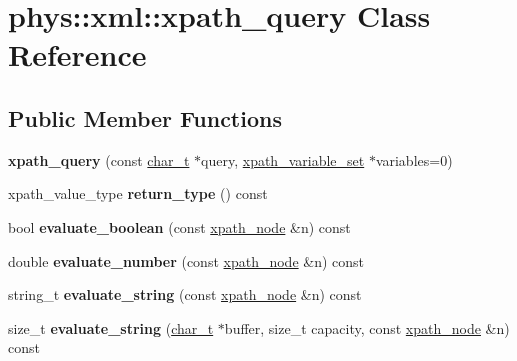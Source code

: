 \hypertarget{classphys_1_1xml_1_1xpath__query}{
\section{phys::xml::xpath\_\-query Class Reference}
\label{de/d9e/classphys_1_1xml_1_1xpath__query}
}
\subsection*{Public Member Functions}
\begin{DoxyCompactItemize}
\item 
\hypertarget{classphys_1_1xml_1_1xpath__query_ac46d4ff6f40637d5a4d0a2069f340ee1}{
{\bfseries xpath\_\-query} (const \hyperlink{namespacephys_1_1xml_afc87705cd1c2917d87b879715a2d8f6e}{char\_\-t} $\ast$query, \hyperlink{classphys_1_1xml_1_1xpath__variable__set}{xpath\_\-variable\_\-set} $\ast$variables=0)}
\label{de/d9e/classphys_1_1xml_1_1xpath__query_ac46d4ff6f40637d5a4d0a2069f340ee1}

\item 
\hypertarget{classphys_1_1xml_1_1xpath__query_a8608ffaa93cb84bea6b64a14c7af8740}{
xpath\_\-value\_\-type {\bfseries return\_\-type} () const }
\label{de/d9e/classphys_1_1xml_1_1xpath__query_a8608ffaa93cb84bea6b64a14c7af8740}

\item 
\hypertarget{classphys_1_1xml_1_1xpath__query_a9c77ca350afe9d4ca792b85f1aff8972}{
bool {\bfseries evaluate\_\-boolean} (const \hyperlink{classphys_1_1xml_1_1xpath__node}{xpath\_\-node} \&n) const }
\label{de/d9e/classphys_1_1xml_1_1xpath__query_a9c77ca350afe9d4ca792b85f1aff8972}

\item 
\hypertarget{classphys_1_1xml_1_1xpath__query_add3ce64b470ba4501cc138d26dfc04ff}{
double {\bfseries evaluate\_\-number} (const \hyperlink{classphys_1_1xml_1_1xpath__node}{xpath\_\-node} \&n) const }
\label{de/d9e/classphys_1_1xml_1_1xpath__query_add3ce64b470ba4501cc138d26dfc04ff}

\item 
\hypertarget{classphys_1_1xml_1_1xpath__query_a050de5645c30898e1fbc4eb3cef8155a}{
string\_\-t {\bfseries evaluate\_\-string} (const \hyperlink{classphys_1_1xml_1_1xpath__node}{xpath\_\-node} \&n) const }
\label{de/d9e/classphys_1_1xml_1_1xpath__query_a050de5645c30898e1fbc4eb3cef8155a}

\item 
\hypertarget{classphys_1_1xml_1_1xpath__query_a6c976cc4bd67c68db71a6d655f4e16f2}{
size\_\-t {\bfseries evaluate\_\-string} (\hyperlink{namespacephys_1_1xml_afc87705cd1c2917d87b879715a2d8f6e}{char\_\-t} $\ast$buffer, size\_\-t capacity, const \hyperlink{classphys_1_1xml_1_1xpath__node}{xpath\_\-node} \&n) const }
\label{de/d9e/classphys_1_1xml_1_1xpath__query_a6c976cc4bd67c68db71a6d655f4e16f2}


\end{DoxyCompactItemize}
